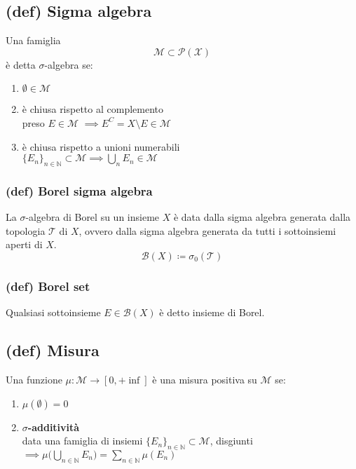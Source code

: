 \subsection{(def) Sigma algebra}
Una famiglia $$\mathcal{M}\subset \mathcal{P(X)}$$ è detta $\sigma$-algebra se:
\begin{enumerate}[label=(\roman*)]
    \item $\emptyset \in\mathcal{M}$
    \item è chiusa rispetto al complemento \\
    preso $E\in\mathcal M $ $ \implies E^C = X\setminus E \in \mathcal M$
    \item è chiusa rispetto a unioni numerabili \\
    $\{ E_n\}_{n\in\mathbb N}\subset \mathcal M \implies \bigcup_n E_n \in \mathcal M$
\end{enumerate}

\subsubsection{(def) Borel sigma algebra}
La $\sigma$-algebra di Borel su un insieme $X$ è data dalla sigma algebra generata dalla topologia $\mathcal T$ di $X$, ovvero dalla sigma algebra generata da tutti i sottoinsiemi aperti di $X$.
$$\mathcal B(X)\coloneq\sigma_0(\mathcal T)$$
\subsubsection{(def) Borel set}
Qualsiasi sottoinsieme $E\in \mathcal B(X)$ è detto insieme di Borel.
\subsection{(def) Misura}
Una funzione $\mu : \mathcal M \to [0,+\inf]$ è una misura positiva su $\mathcal M$ se:
\begin{enumerate}[label=(\roman*)]
    \item \textbf{$\mu(\emptyset)=0$}
    \item \textbf{$\sigma$-additività}
    \\data una famiglia di insiemi $\{E_n\}_{n\in \mathbb N}\subset \mathcal M$, disgiunti $\implies \mu\Big( \bigcup_{n\in \mathbb N}E_n\Big )=\sum_{n\in\mathbb N}\mu(E_n)$
\end{enumerate}
